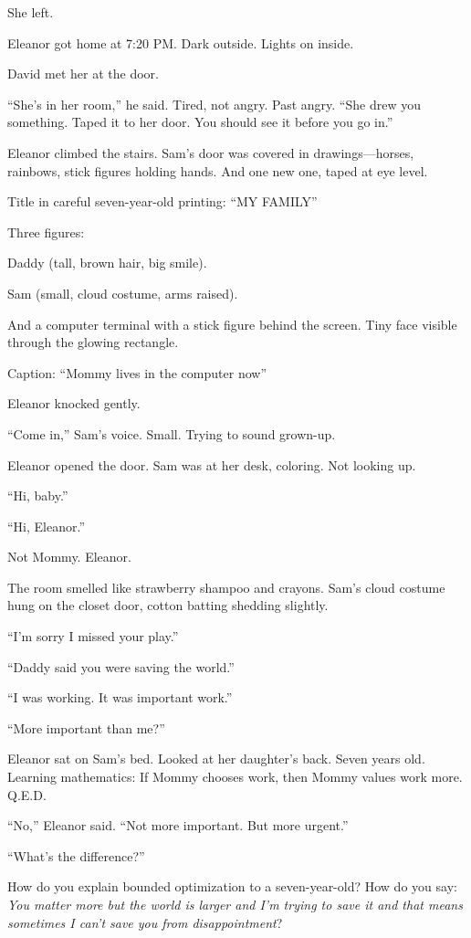 She left.

\scenebreak

Eleanor got home at 7:20 PM. Dark outside. Lights on inside.

David met her at the door.

``She's in her room,'' he said. Tired, not angry. Past angry. ``She drew you something. Taped it to her door. You should see it before you go in.''

Eleanor climbed the stairs. Sam's door was covered in drawings---horses, rainbows, stick figures holding hands. And one new one, taped at eye level.

Title in careful seven-year-old printing: ``MY FAMILY''

Three figures:

Daddy (tall, brown hair, big smile).

Sam (small, cloud costume, arms raised).

And a computer terminal with a stick figure behind the screen. Tiny face visible through the glowing rectangle.

Caption: ``Mommy lives in the computer now''

Eleanor knocked gently.

``Come in,'' Sam's voice. Small. Trying to sound grown-up.

Eleanor opened the door. Sam was at her desk, coloring. Not looking up.

``Hi, baby.''

``Hi, Eleanor.''

Not Mommy. Eleanor.

The room smelled like strawberry shampoo and crayons. Sam's cloud costume hung on the closet door, cotton batting shedding slightly.

``I'm sorry I missed your play.''

``Daddy said you were saving the world.''

``I was working. It was important work.''

``More important than me?''

Eleanor sat on Sam's bed. Looked at her daughter's back. Seven years old. Learning mathematics: If Mommy chooses work, then Mommy values work more. Q.E.D.

``No,'' Eleanor said. ``Not more important. But more urgent.''

``What's the difference?''

How do you explain bounded optimization to a seven-year-old? How do you say: \emph{You matter more but the world is larger and I'm trying to save it and that means sometimes I can't save you from disappointment}?

